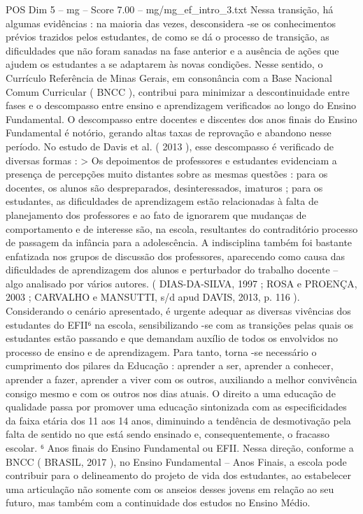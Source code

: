 \begin{textsample}{POS Dim 5 – mg – Score 7.00 – mg/mg\_ef\_intro\_3.txt}  \label{ex:f5_pos_184}
Nessa transição, há algumas evidências : na maioria das vezes, desconsidera -se os conhecimentos prévios trazidos pelos estudantes, de como se dá o processo de transição, as dificuldades que não foram sanadas na fase anterior e a ausência de ações que ajudem os estudantes a se adaptarem às novas condições.
Nesse sentido, o Currículo Referência de Minas Gerais, em consonância com a Base Nacional Comum Curricular ( BNCC ), contribui para minimizar a descontinuidade entre fases e o descompasso entre ensino e aprendizagem verificados ao longo do Ensino Fundamental.
O descompasso entre docentes e discentes dos anos finais do Ensino Fundamental é notório, gerando altas taxas de reprovação e abandono nesse período.
No estudo de Davis et al. ( 2013 ), esse descompasso é verificado de diversas formas : > Os depoimentos de professores e estudantes evidenciam a presença de percepções muito distantes sobre as mesmas questões : para os docentes, os alunos são despreparados, desinteressados, imaturos ; para os estudantes, as dificuldades de aprendizagem estão relacionadas à falta de planejamento dos professores e ao fato de ignorarem que mudanças de comportamento e de interesse são, na escola, resultantes do contraditório processo de passagem da infância para a adolescência.
A indisciplina também foi bastante enfatizada nos grupos de discussão dos professores, aparecendo como causa das dificuldades de aprendizagem dos alunos e perturbador do trabalho docente – algo analisado por vários autores. ( DIAS-DA-SILVA, 1997 ; ROSA e PROENÇA, 2003 ; CARVALHO e MANSUTTI, s/d apud DAVIS, 2013, p. 116 ).
Considerando o cenário apresentado, é urgente adequar as diversas vivências dos estudantes do EFII⁶ na escola, sensibilizando -se com as transições pelas quais os estudantes estão passando e que demandam auxílio de todos os envolvidos no processo de ensino e de aprendizagem.
Para tanto, torna -se necessário o cumprimento dos pilares da Educação : aprender a ser, aprender a conhecer, aprender a fazer, aprender a viver com os outros, auxiliando a melhor convivência consigo mesmo e com os outros nos dias atuais.
O direito a uma educação de qualidade passa por promover uma educação sintonizada com as especificidades da faixa etária dos 11 aos 14 anos, diminuindo a tendência de desmotivação pela falta de sentido no que está sendo ensinado e, consequentemente, o fracasso escolar. ⁶ Anos finais do Ensino Fundamental ou EFII.
Nessa direção, conforme a BNCC ( BRASIL, 2017 ), no Ensino Fundamental – Anos Finais, a escola pode contribuir para o delineamento do projeto de vida dos estudantes, ao estabelecer uma articulação não somente com os anseios desses jovens em relação ao seu futuro, mas também com a continuidade dos estudos no Ensino Médio.

\end{textsample}
